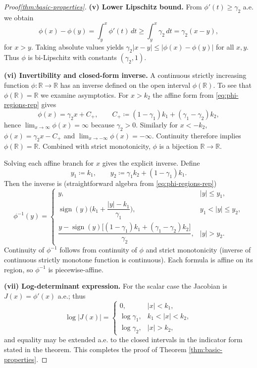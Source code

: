 \documentclass[11pt, twoside, openright, english]{article}
\DeclareMathOperator{\sign}{sign}
\newcommand{\R}{\mathbb{R}}
\numberwithin{equation}{section}
\theoremstyle{plain}
\theoremstyle{definition}
\theoremstyle{remark}
\begin{document}
\begin{proof}[Proof\ref{thm:basic-properties}]
\medskip\noindent\textbf{(v) Lower Lipschitz bound.} From $\phi'(t)\ge \gamma_2$ a.e. we obtain
\[
\phi(x)-\phi(y) = \int_y^x \phi'(t)\,dt \ge \int_y^x \gamma_2\,dt = \gamma_2 (x-y),
\]
for $x>y$. Taking absolute values yields $\gamma_2 |x-y|\le |\phi(x)-\phi(y)|$ for all $x,y$. Thus $\phi$ is bi-Lipschitz with constants $(\gamma_2,1)$.

\medskip\noindent\textbf{(vi) Invertibility and closed-form inverse.} A continuous strictly increasing function $\phi:\R\to\R$ has an inverse defined on the open interval $\phi(\R)$. To see that $\phi(\R)=\R$ we examine asymptotics. For $x>k_2$ the affine form from \eqref{eq:phi-regions-rep} gives
\[
\phi(x) = \gamma_2 x + C_+, \qquad C_+ \coloneqq (1-\gamma_1)k_1 + (\gamma_1-\gamma_2)k_2,
\]
hence $\lim_{x\to\infty}\phi(x)=\infty$ because $\gamma_2>0$. Similarly for $x<-k_2$, $\phi(x)=\gamma_2 x - C_+$ and $\lim_{x\to-\infty}\phi(x)=-\infty$. Continuity therefore implies $\phi(\R)=\R$. Combined with strict monotonicity, $\phi$ is a bijection $\R\to\R$.

Solving each affine branch for $x$ gives the explicit inverse. Define
\begin{equation}\label{eq:y-boundaries-rep}
y_1\coloneqq k_1,\qquad y_2\coloneqq \gamma_1 k_2 + (1-\gamma_1)k_1.
\end{equation}
Then the inverse is (straightforward algebra from \eqref{eq:phi-regions-rep})
\begin{equation}\label{eq:phi-inv-rep}
\phi^{-1}(y)=
\begin{cases}
y, & |y|\le y_1,\\[6pt]
\sign(y)\Big(k_1 + \dfrac{|y|-k_1}{\gamma_1}\Big), & y_1<|y|\le y_2,\\[10pt]
\dfrac{y-\operatorname{sign}(y)\big[(1-\gamma_1)k_1+(\gamma_1-\gamma_2)k_2\big]}{\gamma_2}, & |y|>y_2.
\end{cases}
\end{equation}
Continuity of $\phi^{-1}$ follows from continuity of $\phi$ and strict monotonicity (inverse of continuous strictly monotone function is continuous). Each formula is affine on its region, so $\phi^{-1}$ is piecewise-affine.

\medskip\noindent\textbf{(vii) Log-determinant expression.} For the scalar case the Jacobian is $J(x)=\phi'(x)$ a.e.; thus
\[
\log|J(x)| = 
\begin{cases}
0, & |x|<k_1,\\
\log\gamma_1, & k_1<|x|<k_2,\\
\log\gamma_2, & |x|>k_2,
\end{cases}
\]
and equality may be extended a.e. to the closed intervals in the indicator form stated in the theorem. This completes the proof of Theorem \ref{thm:basic-properties}.
\end{proof}
\end{document}
